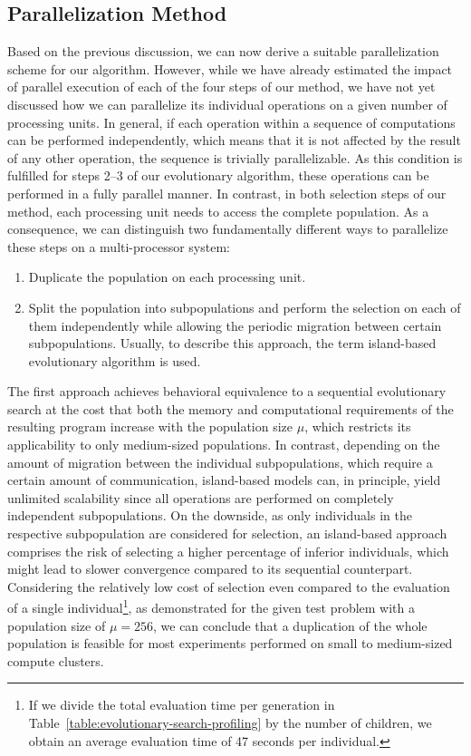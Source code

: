 \subsection{Parallelization Method}
Based on the previous discussion, we can now derive a suitable parallelization scheme for our algorithm.
However, while we have already estimated the impact of parallel execution of each of the four steps of our method, we have not yet discussed how we can parallelize its individual operations on a given number of processing units. 
In general, if each operation within a sequence of computations can be performed independently, which means that it is not affected by the result of any other operation, the sequence is trivially parallelizable.
As this condition is fulfilled for steps 2--3 of our evolutionary algorithm, these operations can be performed in a fully parallel manner.
In contrast, in both selection steps of our method, each processing unit needs to access the complete population.
As a consequence, we can distinguish two fundamentally different ways to parallelize these steps on a multi-processor system:
\begin{enumerate}
	\item Duplicate the population on each processing unit.
	\item Split the population into subpopulations and perform the selection on each of them independently while allowing the periodic migration between certain subpopulations. Usually, to describe this approach, the term island-based evolutionary algorithm is used.
\end{enumerate}   
The first approach achieves behavioral equivalence to a sequential evolutionary search at the cost that both the memory and computational requirements of the resulting program increase with the population size $\mu$, which restricts its applicability to only medium-sized populations.
In contrast, depending on the amount of migration between the individual subpopulations, which require a certain amount of communication, island-based models can, in principle, yield unlimited scalability since all operations are performed on completely independent subpopulations.
On the downside, as only individuals in the respective subpopulation are considered for selection, an island-based approach comprises the risk of selecting a higher percentage of inferior individuals, which might lead to slower convergence compared to its sequential counterpart.
Considering the relatively low cost of selection even compared to the evaluation of a single individual\footnote{If we divide the total evaluation time per generation in Table~\ref{table:evolutionary-search-profiling} by the number of children, we obtain an average evaluation time of 47 seconds per individual.}, as demonstrated for the given test problem with a population size of $\mu = 256$, we can conclude that a duplication of the whole population is feasible for most experiments performed on small to medium-sized compute clusters.
